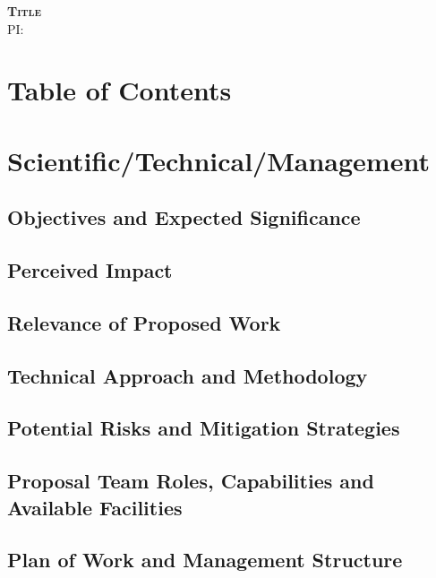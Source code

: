 \documentclass[oneside,12pt]{amsart}
\begin{document}
\begin{center}
\textsc{\textbf{Title}\\
PI: \\
}
\end{center}

\section{Table of Contents}
\renewcommand\contentsname{}
\tableofcontents

\clearpage

\section{Scientific/Technical/Management}

\subsection{Objectives and Expected Significance}\label{sec:objectives}

\subsection{Perceived Impact}\label{sec:impact}

\subsection{Relevance of Proposed Work}\label{sec:relevance}

\subsection{Technical Approach and Methodology}\label{sec:tech}

\subsection{Potential Risks and Mitigation Strategies}\label{sec:risks}

\subsection{Proposal Team Roles, Capabilities and Available Facilities}\label{sec:capab}

\subsection{Plan of Work and Management Structure}\label{sec:work}
\end{document}
